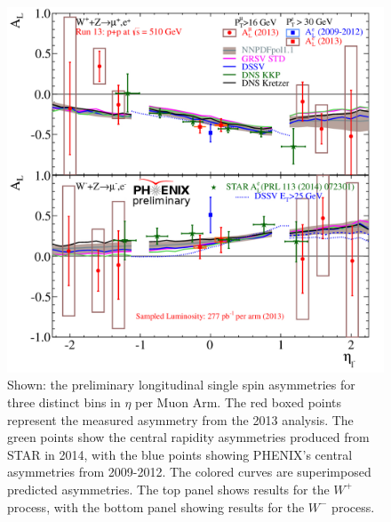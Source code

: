 \begin{figure}[ht]
  \centering
  \includegraphics[width=0.8\linewidth]{./figures/prelim_AL_6bins.jpg}
  \caption{
    Shown: the preliminary longitudinal single spin asymmetries for three
    distinct bins in $\eta$ per Muon Arm. The red boxed points represent the
    measured asymmetry from the 2013 analysis. The green points show the central
    rapidity asymmetries produced from STAR in 2014, with the blue points
    showing PHENIX's central asymmetries from 2009-2012. The colored curves are
    superimposed predicted asymmetries. The top panel shows results for the
    $W^+$ process, with the bottom panel showing results for the $W^-$ process.
  }
  \label{fig:al_preliminary_three_eta}
\end{figure}

